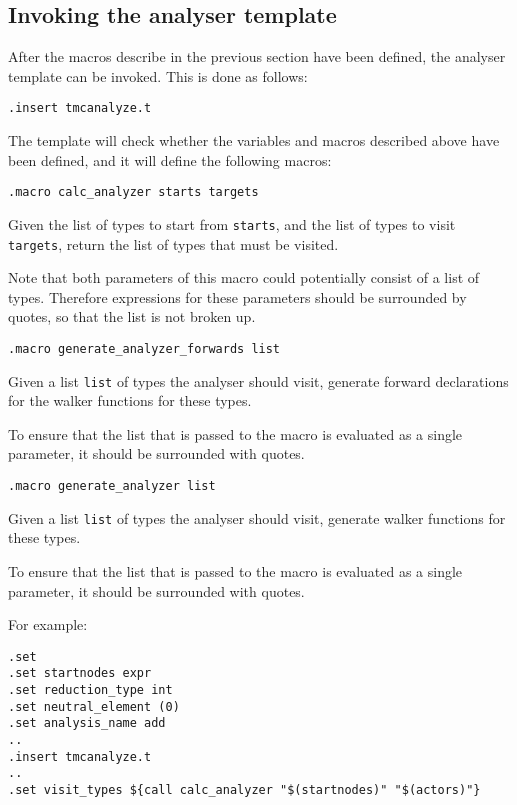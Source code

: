 \subsection{Invoking the analyser template}
After the macros describe in the previous section have been defined,
the analyser template can be invoked. This is done as follows:
\begin{verbatim}
.insert tmcanalyze.t
\end{verbatim}
The template will check whether the variables and macros described above
have been defined, and it will define the following macros:
\begin{verbatim}
.macro calc_analyzer starts targets
\end{verbatim}
\begin{desc}
Given the list of types to start from \texttt{starts}, and the list of types
to visit \texttt{targets}, return the list of types that must be visited.
\par
Note that both parameters of this macro could potentially consist of
a list of types. Therefore expressions for these parameters should be
surrounded by quotes, so that the list is not broken up.
\end{desc}
\begin{verbatim}
.macro generate_analyzer_forwards list
\end{verbatim}
\begin{desc}
Given a list \texttt{list} of types the analyser should visit, generate
forward declarations for the walker functions for these types.
\par
To ensure that the list that is passed to the macro is evaluated as
a single parameter, it should be surrounded with quotes.
\end{desc}
\begin{verbatim}
.macro generate_analyzer list
\end{verbatim}
\begin{desc}
Given a list \texttt{list} of types the analyser should visit, generate
walker functions for these types.
\par
To ensure that the list that is passed to the macro is evaluated as a
single parameter, it should be surrounded with quotes.
\end{desc}
For example:
\begin{verbatim}
.set 
.set startnodes expr
.set reduction_type int
.set neutral_element (0)
.set analysis_name add
..
.insert tmcanalyze.t
..
.set visit_types ${call calc_analyzer "$(startnodes)" "$(actors)"}
\end{verbatim}
